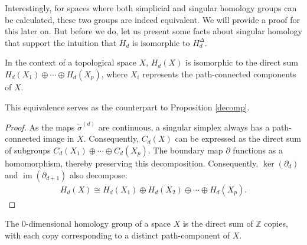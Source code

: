 Interestingly, for spaces where both simplicial and singular homology groups can be calculated, these two groups are indeed equivalent. We will provide a proof for this later on. But before we do, let us present some facts about singular homology that support the intuition that \( H_{d} \) is isomorphic to \( H^{\Delta}_{d} \).

\begin{proposition}{\cite[p.108f]{hatcher2005algebraic}}
	In the context of a topological space \( X \), \( H_{d}(X) \) is isomorphic to the direct sum \( H_{d}(X_{1}) \oplus \cdots \oplus H_{d}(X_{p}) \), where \( X_{i} \) represents the path-connected components of \( X \).
\end{proposition}

This equivalence serves as the counterpart to Proposition \ref{decomp}.

\begin{proof}
	As the maps \( \tilde{\sigma}^{(d)} \) are continuous, a singular simplex always has a path-connected image in \( X \). Consequently, \( C_{d}(X) \) can be expressed as the direct sum of subgroups \( C_{d}(X_{1}) \oplus \cdots \oplus C_{d}(X_{p}) \). The boundary map \( \partial \) functions as a homomorphism, thereby preserving this decomposition. Consequently, \( \ker(\partial_{d}) \) and \( \operatorname{im}(\partial_{d+1}) \) also decompose:
	\begin{align}
		H_{d}(X) \cong H_{d}(X_{1}) \oplus H_{d}(X_{2}) \oplus \cdots \oplus H_{d}(X_{p}). 
	\end{align}
\end{proof}

\begin{proposition}
	The \( 0 \)-dimensional homology group of a space \( X \) is the direct sum of \(\mathbb{Z}\) copies, with each copy corresponding to a distinct path-component of \( X \).
\end{proposition}

